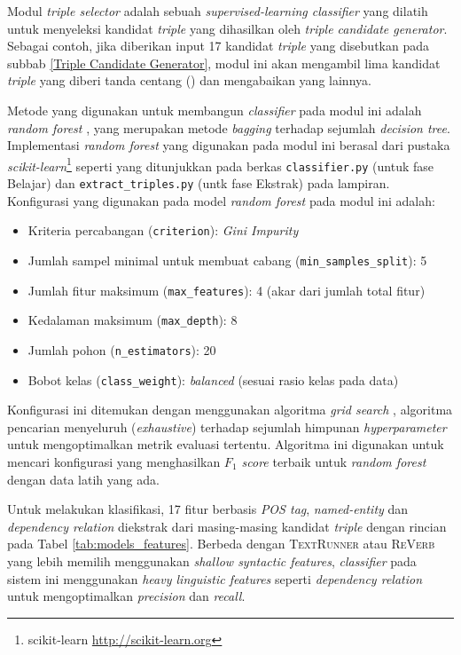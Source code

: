 Modul \textit{triple selector} adalah sebuah \textit{supervised-learning classifier} yang dilatih untuk menyeleksi kandidat \textit{triple} yang dihasilkan oleh \textit{triple candidate generator}. Sebagai contoh, jika diberikan input 17 kandidat \textit{triple} yang disebutkan pada subbab \ref{Triple Candidate Generator}, modul ini akan mengambil lima kandidat \textit{triple} yang diberi tanda centang () dan mengabaikan yang lainnya.

Metode yang digunakan untuk membangun \textit{classifier} pada modul ini adalah \textit{random forest} \citep{breiman2001random}, yang merupakan metode \textit{bagging} terhadap sejumlah \textit{decision tree}. Implementasi \textit{random forest} yang digunakan pada modul ini berasal dari pustaka \textit{scikit-learn}\footnote{scikit-learn \url{http://scikit-learn.org}} seperti yang ditunjukkan pada berkas \verb|classifier.py| (untuk fase Belajar) dan \verb|extract_triples.py| (untk fase Ekstrak) pada lampiran. Konfigurasi yang digunakan pada model \textit{random forest} pada modul ini adalah:

\begin{itemize}
\item Kriteria percabangan (\verb|criterion|): \textit{Gini Impurity}
\item Jumlah sampel minimal untuk membuat cabang  (\verb|min_samples_split|): 5
\item Jumlah fitur maksimum  (\verb|max_features|): 4 (akar dari jumlah total fitur)
\item Kedalaman maksimum  (\verb|max_depth|): 8
\item Jumlah pohon (\verb|n_estimators|): 20
\item Bobot kelas (\verb|class_weight|): \textit{balanced} (sesuai rasio kelas pada data)
\end{itemize}

Konfigurasi ini ditemukan dengan menggunakan algoritma \textit{grid search} \citep{wasserman2015grid}, algoritma pencarian menyeluruh (\textit{exhaustive}) terhadap sejumlah himpunan \textit{hyperparameter} untuk mengoptimalkan metrik evaluasi tertentu. Algoritma ini digunakan untuk mencari konfigurasi yang menghasilkan \textit{$F_1$ score} terbaik untuk \textit{random forest} dengan data latih yang ada.

Untuk melakukan klasifikasi, 17 fitur berbasis \textit{POS tag}, \textit{named-entity} dan \textit{dependency relation} diekstrak dari masing-masing kandidat \textit{triple} dengan rincian pada Tabel \ref{tab:models_features}. Berbeda dengan \textsc{TextRunner} atau \textsc{ReVerb} \citep{banko2007open} \citep{etzioni2011open} yang lebih memilih menggunakan \textit{shallow syntactic features}, \textit{classifier} pada sistem ini menggunakan \textit{heavy linguistic features} seperti \textit{dependency relation} untuk mengoptimalkan \textit{precision} dan \textit{recall}.

